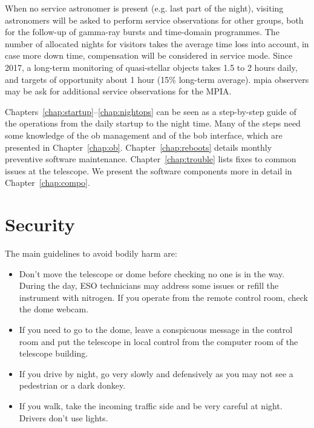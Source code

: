 \documentclass[11pt,fleqn,a4paper]{book}
\begin{document}
When no \gls{service} astronomer is present (e.g. last part of the night), visiting astronomers will be asked to perform service observations for other groups, both for the follow-up of gamma-ray bursts and time-domain programmes.  The number of allocated nights for \glspl{visitor} takes the average time loss into account, in case more down time, compensation will be considered in service mode.  Since 2017, a long-term monitoring of quasi-stellar objects takes 1.5 to 2 hours daily, and targets of opportunity about 1 hour (15\% long-term average).  \gls{mpia} observers may be ask for additional \gls{service} observations for the MPIA.

Chapters~\ref{chap:startup}--\ref{chap:nightops} can be seen as a step-by-step
guide of the operations from the daily startup to the night time. Many of the
steps need some knowledge of the \gls{ob} management and of the \gls{bob}
interface, which are presented in Chapter~\ref{chap:ob}.
Chapter~\ref{chap:reboots} details monthly preventive software maintenance.
Chapter~\ref{chap:trouble} lists fixes to common issues at the telescope.  We
present the software components more in detail in Chapter~\ref{chap:compo}.

\section{Security}

The main guidelines to avoid bodily harm are:
\begin{itemize}
\item Don't move the telescope or \gls{dome} before checking no one is in the way.  During the day, ESO technicians may address some issues or refill the instrument with nitrogen.  If you operate from the remote \gls{control room}, check the dome \gls{webcam}.
\item If you need to go to the \gls{dome}, leave a conspicuous message in the \gls{control room} and put the telescope in local control from the \gls{computer room} of the telescope building.
\item If you drive by night, go very slowly and defensively as you may not see a pedestrian or a dark donkey.  
\item If you walk, take the incoming traffic side and be very careful at night. Drivers don't use lights.
\end{itemize}
\end{document}
